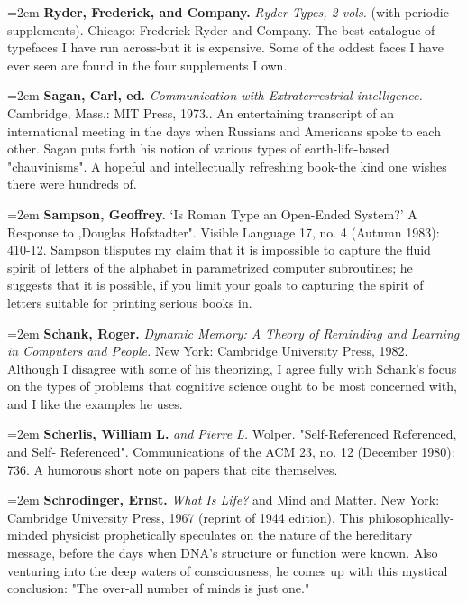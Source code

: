 \par\noindent\hangindent=2em {\bf Ryder, Frederick, and Company.} {\it Ryder Types, 2 vols.} (with periodic supplements). Chicago: Frederick Ryder and Company. The best catalogue of typefaces I have run across-but it is expensive. Some of the oddest faces I have ever seen are found in the four supplements I own.

\par\noindent\hangindent=2em {\bf Sagan, Carl, ed.} {\it Communication with Extraterrestrial intelligence.} Cambridge, Mass.: MIT Press, 1973.. An entertaining transcript of an international meeting in the days when Russians and Americans spoke to each other. Sagan puts forth his notion of various types of earth-life-based "chauvinisms". A hopeful and intellectually refreshing book-the kind one wishes there were hundreds of.

\par\noindent\hangindent=2em {\bf Sampson, Geoffrey.} `Is Roman Type an Open-Ended System?' A Response to ,Douglas Hofstadter". Visible Language 17, no. 4 (Autumn 1983): 410-12. Sampson tlisputes my claim that it is impossible to capture the fluid spirit of letters of the alphabet in parametrized computer subroutines; he suggests that it is possible, if you limit your goals to capturing the spirit of letters suitable for printing serious books in.

\par\noindent\hangindent=2em {\bf Schank, Roger.} {\it Dynamic Memory: A Theory of Reminding and Learning in Computers and People.} New York: Cambridge University Press, 1982. Although I disagree with some of his theorizing, I agree fully with Schank's focus on the types of problems that cognitive science ought to be most concerned with, and I like the examples he uses.

\par\noindent\hangindent=2em {\bf Scherlis, William L.} {\it and Pierre L.} Wolper. "Self-Referenced Referenced, and Self- Referenced". Communications of the ACM 23, no. 12 (December 1980): 736. A humorous short note on papers that cite themselves.

\par\noindent\hangindent=2em {\bf Schrodinger, Ernst.} {\it What Is Life?} and Mind and Matter. New York: Cambridge University Press, 1967 (reprint of 1944 edition). This philosophically-minded physicist prophetically speculates on the nature of the hereditary message, before the days when DNA's structure or function were known. Also venturing into the deep waters of consciousness, he comes up with this mystical conclusion: "The over-all number of minds is just one."

